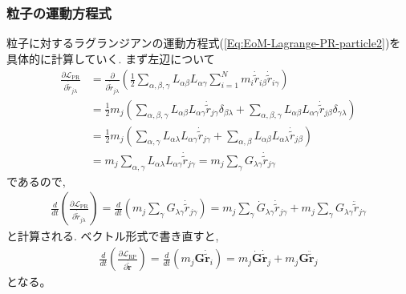 \subsubsection{粒子の運動方程式}
粒子に対するラグランジアンの運動方程式(\ref{Eq:EoM-Lagrange-PR-particle2})を具体的に計算していく.
まず左辺について
\begin{align}
  \frac{\partial \mathcal{L}_{\mathrm{PR}}}
       {\partial \dot{\tilde{r}}_{j \lambda}}
  &=
  \frac{\partial}{\partial \dot{\tilde{r}}_{j \lambda}}
  \left(
    \frac{1}{2}
    \sum_{\alpha,\beta,\gamma}
    L_{\alpha\beta} L_{\alpha\gamma}
    \sum_{i=1}^{N} m_{i}
    \dot{\tilde{r}}_{i\beta} \dot{\tilde{r}}_{i\gamma}
  \right)
  \\
  &=
  \frac{1}{2} m_{j}
  \left(
      \sum_{\alpha,\beta,\gamma}
      L_{\alpha\beta} L_{\alpha\gamma}
      \dot{\tilde{r}}_{j\gamma} \delta_{\beta \lambda}
      +
      \sum_{\alpha,\beta,\gamma}
      L_{\alpha\beta} L_{\alpha\gamma}
      \dot{\tilde{r}}_{j\beta} \delta_{\gamma \lambda}
  \right)
  \\
  &=
  \frac{1}{2} m_{j}
  \left(
      \sum_{\alpha,\gamma}
      L_{\alpha\lambda} L_{\alpha\gamma}
      \dot{\tilde{r}}_{j\gamma}
      +
      \sum_{\alpha,\beta}
      L_{\alpha\beta} L_{\alpha\lambda}
      \dot{\tilde{r}}_{j\beta}
  \right)
  \\
  &=
  m_{j}
  \sum_{\alpha,\gamma}
  L_{\alpha\lambda} L_{\alpha\gamma} \dot{\tilde{r}}_{j \gamma}
  =
  m_{j}
  \sum_{\gamma}
  G_{\lambda\gamma}\dot{\tilde{r}}_{j \gamma}
\end{align}
であるので,
\begin{align}
  \frac{d}{dt}
  \left(
    \frac{\partial \mathcal{L}_{\mathrm{PR}}}
         {\partial \dot{\tilde{r}}_{j \lambda}}
  \right)
  =
  \frac{d}{dt}
  \left(
    m_{j}
    \sum_{\gamma}
    G_{\lambda\gamma}\dot{\tilde{r}}_{j \gamma}
  \right)
  =
  m_{j}
  \sum_{\gamma}
  \dot{G}_{\lambda\gamma}\dot{\tilde{r}}_{j \gamma}
  +
  m_{j}
  \sum_{\gamma}
  G_{\lambda\gamma} \ddot{\tilde{r}}_{j \gamma}
\end{align}
と計算される. ベクトル形式で書き直すと,
\begin{align}
  \frac{d}{dt}
  \left(
    \frac{\partial \mathcal{L}_{\mathrm{RP}}}{\partial \dot{\tilde{\bm{r}}}}
  \right)
  =
  \frac{d}{dt}
  \left(
    m_{j} \bm{G} \dot{\tilde{\bm{r}}}_{i}
  \right)
  =
  m_{j} \dot{\bm{G}} \dot{\tilde{\bm{r}}}_{j}
  +
  m_{j} \bm{G} \ddot{\tilde{\bm{r}}}_{j}
  \label{Eq:EoM-PR-particle-left}
\end{align}
となる。

